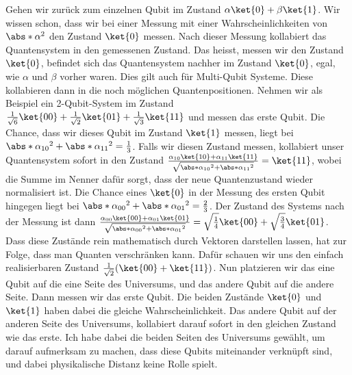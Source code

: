 Gehen wir zurück zum einzelnen Qubit im Zustand $\alpha\ket{0} + \beta\ket{1}$. Wir wissen schon, dass wir bei einer Messung mit einer Wahrscheinlichkeiten von $\abs*{\alpha}^2$ den Zustand $\ket{0}$ messen. Nach dieser Messung kollabiert das Quantensystem in den gemessenen Zustand. Das heisst, messen wir den Zustand $\ket{0}$, befindet sich das Quantensystem nachher im Zustand $\ket{0}$, egal, wie $\alpha$ und $\beta$ vorher waren. Dies gilt auch für Multi-Qubit Systeme. Diese kollabieren dann in die noch möglichen Quantenpositionen. Nehmen wir als Beispiel ein 2-Qubit-System im Zustand $\frac{1}{\sqrt{6}}\ket{00} + \frac{1}{\sqrt{2}}\ket{01} + \frac{1}{\sqrt{3}}\ket{11}$ und messen das erste Qubit. Die Chance, dass wir dieses Qubit im Zustand $\ket{1}$ messen, liegt bei $\abs*{\alpha_{10}}^2 + \abs*{\alpha_{11}}^2 = \frac{1}{3}$. Falls wir diesen Zustand messen, kollabiert unser Quantensystem sofort in den Zustand $\frac{\alpha_{10}\ket{10} + \alpha_{11}\ket{11}}{\sqrt{\abs*{\alpha_{10}}^2 + \abs*{\alpha_{11}}^2}} = \ket{11}$, wobei die Summe im Nenner dafür sorgt, dass der neue Quantenzustand wieder normalisiert ist. Die Chance eines $\ket{0}$ in der Messung des ersten Qubit hingegen liegt bei $\abs*{\alpha_{00}}^2 + \abs*{\alpha_{01}}^2 = \frac{2}{3}$. Der Zustand des Systems nach der Messung ist dann $\frac{\alpha_{00}\ket{00} + \alpha_{01}\ket{01}}{\sqrt{\abs*{\alpha_{00}}^2 + \abs*{\alpha_{01}}^2}} = \sqrt{\frac{1}{4}}\ket{00} + \sqrt{\frac{3}{4}}\ket{01}$.
Dass diese Zustände rein mathematisch durch Vektoren darstellen lassen, hat zur Folge, dass man Quanten verschränken kann. Dafür schauen wir uns den einfach realisierbaren Zustand $\frac{1}{\sqrt{2}}(\ket{00} + \ket{11})$. Nun platzieren wir das eine Qubit auf die eine Seite des Universums, und das andere Qubit auf die andere Seite. Dann messen wir das erste Qubit. Die beiden Zustände $\ket{0}$ und $\ket{1}$ haben dabei die gleiche Wahrscheinlichkeit. Das andere Qubit auf der anderen Seite des Universums, kollabiert darauf sofort in den gleichen Zustand wie das erste. Ich habe dabei die beiden Seiten des Universums gewählt, um darauf aufmerksam zu machen, dass diese Qubits miteinander verknüpft sind, und dabei physikalische Distanz keine Rolle spielt.